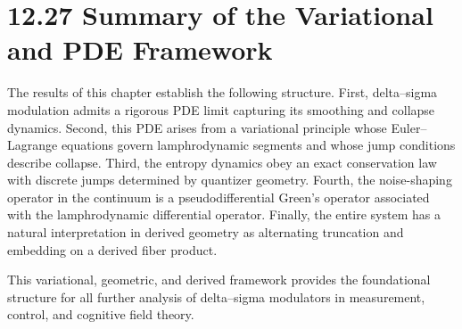 \section*{12.27 Summary of the Variational and PDE Framework}

The results of this chapter establish the following structure.  
First, delta--sigma modulation admits a rigorous PDE limit capturing its smoothing and collapse dynamics.  
Second, this PDE arises from a variational principle whose Euler--Lagrange equations govern lamphrodynamic segments and whose jump conditions describe collapse.  
Third, the entropy dynamics obey an exact conservation law with discrete jumps determined by quantizer geometry.  
Fourth, the noise-shaping operator in the continuum is a pseudodifferential Green’s operator associated with the lamphrodynamic differential operator.  
Finally, the entire system has a natural interpretation in derived geometry as alternating truncation and embedding on a derived fiber product.

This variational, geometric, and derived framework provides the foundational structure for all further analysis of delta--sigma modulators in measurement, control, and cognitive field theory.
